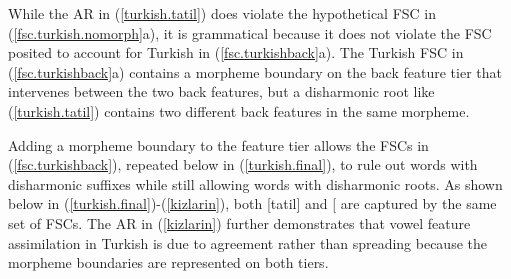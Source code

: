 \documentclass[,doc,floatsintext]{apa6}
\theoremstyle{definition}
\theoremstyle{definition}
\theoremstyle{definition}
\theoremstyle{remark}
\begin{document}
\noindent While the AR in (\ref{turkish.tatil}) does violate the
hypothetical FSC in (\ref{fsc.turkish.nomorph}a), it is grammatical
because it does not violate the FSC posited to account for Turkish in
(\ref{fsc.turkishback}a). The Turkish FSC in (\ref{fsc.turkishback}a)
contains a morpheme boundary on the back feature tier that intervenes
between the two back features, but a disharmonic root like
(\ref{turkish.tatil}) contains two different back features in the same
morpheme.

Adding a morpheme boundary to the feature tier allows the FSCs in
(\ref{fsc.turkishback}), repeated below in (\ref{turkish.final}), to
rule out words with disharmonic suffixes while still allowing words with
disharmonic roots. As shown below in
(\ref{turkish.final})-(\ref{kizlarin}), both {[}tatil{]} and
{[}\textipa{\LARGE+}\textipa{1n}{]} are
captured by the same set of FSCs. The AR in (\ref{kizlarin}) further
demonstrates that vowel feature assimilation in Turkish is due to
agreement rather than spreading because the morpheme boundaries are
represented on both tiers.
\end{document}
